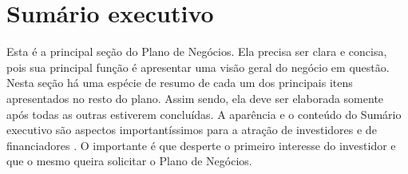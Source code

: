 \chapter{Sumário executivo}

Esta é a principal seção do Plano de Negócios. Ela precisa ser clara e 
concisa, pois sua principal função é apresentar uma visão geral do negócio em 
questão. Nesta seção há uma espécie de resumo de cada um dos principais itens 
apresentados no resto do plano. Assim sendo, ela deve ser elaborada somente 
após todas as outras estiverem concluídas.  A aparência e o conteúdo
do Sumário executivo são aspectos importantíssimos para a atração de
investidores e de financiadores \cite{franca2005captacao}.   O importante
é que desperte o primeiro interesse do investidor e que o mesmo queira
solicitar o Plano de Negócios.
